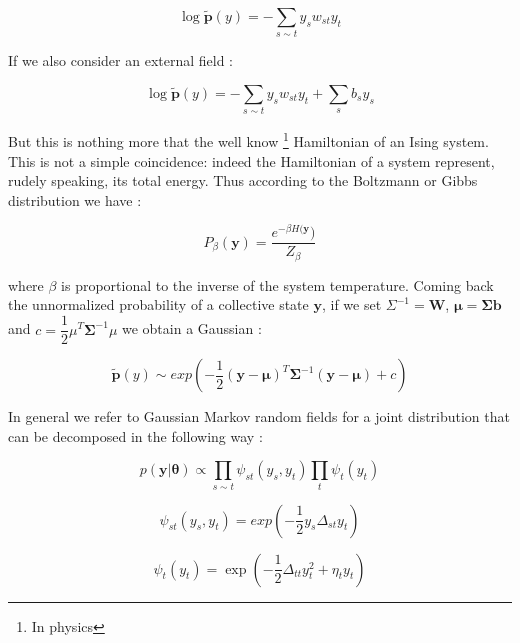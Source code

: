 \documentclass[12pt,%
               a4paper,%
               oneside,openany,%
               titlepage,%
               headinclude,footinclude,%
               BCOR5mm,%
               cleardoublepage=empty,%
               tablecaptionabove,%
               floatperchapter,
               ]{scrreprt}                 %
\begin{document}
\begin{equation}
\log\tilde{\textbf{p}}(y)= -\sum_{s\sim t}y_{s}w_{st}y_{t}
\end{equation}

If we also consider an external field \cite{murphy2012machine}:

\begin{equation}
\log\tilde{\textbf{p}}(y)= -\sum_{s\sim t}y_{s}w_{st}y_{t}+\sum_{s}b_{s}y_{s}
\end{equation}

But this is nothing more that the well know \footnote{In physics} Hamiltonian of an Ising system. This is not a simple coincidence:  indeed the Hamiltonian of a system represent,  rudely speaking,  its total energy.  Thus according to the Boltzmann or Gibbs distribution we have \cite{murphy2012machine}:

\begin{equation}
P_{\beta}(\textbf{y})=\dfrac{e^{-\beta H(\textbf{y}})}{Z_{\beta}}
\end{equation}

where $\beta$ is proportional to the inverse of the system temperature.  Coming back the unnormalized probability of a collective state $\textbf{y}$,  if we set $\Sigma^{-1}=\textbf{W}$,  $\boldsymbol{\mu}=\boldsymbol{\Sigma} \textbf{b}$ and $c=\dfrac{1}{2}\mu^{T}\boldsymbol{\Sigma}^{-1}\mu$ we obtain a Gaussian \cite{murphy2012machine}:

\begin{equation}
\tilde{\textbf{p}}(y)\sim exp\left( -\frac{1}{2} (\textbf{y}-\boldsymbol{\mu})^{T} \boldsymbol{\Sigma}^{-1} (\textbf{y}-\boldsymbol{\mu}) + c \right)
\end{equation}

In general we refer to Gaussian Markov random fields for a joint distribution that can be decomposed in the following way \cite{murphy2012machine}:

\begin{equation}
p\left(\textbf{y}|\boldsymbol{\theta}\right) \propto \prod_{s\sim t} \psi_{st}\left(y_{s},y_{t}\right)\prod_{t}\psi_{t}\left(y_{t}\right)
\end{equation}

\begin{equation}
\psi_{st}\left( y_{s},y_{t} \right)=exp\left( -\dfrac{1}{2} y_{s}\Delta_{st}y_{t} \right)
\end{equation}

\begin{equation}
\psi_{t}\left(y_{t}\right)= \exp \left( -\dfrac{1}{2}\Delta_{tt}y^{2}_{t}+\eta_{t}y_{t}\right)
\end{equation}
\end{document}
